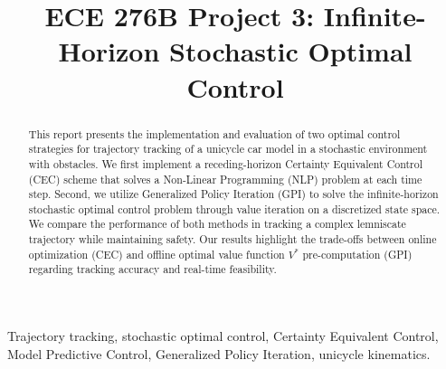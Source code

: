 \documentclass[conference]{IEEEtran}
\begin{document}
\title{ECE 276B Project 3: Infinite-Horizon Stochastic Optimal Control}

\author{
}

\maketitle

\begin{abstract}
This report presents the implementation and evaluation of two optimal control strategies for trajectory tracking of a unicycle car model in a stochastic environment with obstacles. We first implement a receding-horizon Certainty Equivalent Control (CEC) scheme that solves a Non-Linear Programming (NLP) problem at each time step. Second, we utilize Generalized Policy Iteration (GPI) to solve the infinite-horizon stochastic optimal control problem through value iteration on a discretized state space. We compare the performance of both methods in tracking a complex lemniscate trajectory while maintaining safety. Our results highlight the trade-offs between online optimization (CEC) and offline optimal value function $V^*$ pre-computation (GPI) regarding tracking accuracy and real-time feasibility.
\end{abstract}

\begin{IEEEkeywords}
Trajectory tracking, stochastic optimal control, Certainty Equivalent Control, Model Predictive Control, Generalized Policy Iteration, unicycle kinematics.
\end{IEEEkeywords}
\end{document}
